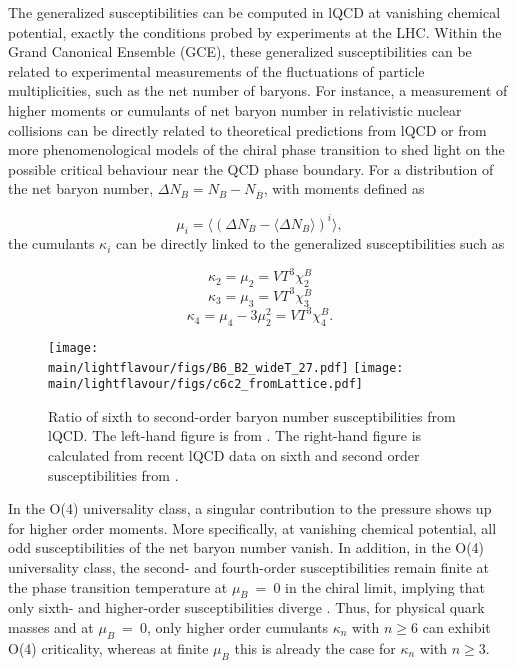 \noindent The generalized susceptibilities can be computed in lQCD at vanishing chemical potential, exactly the conditions probed by experiments at the LHC. Within the Grand Canonical Ensemble (GCE), these generalized susceptibilities can be related to experimental measurements of the fluctuations of particle multiplicities, such as the net number of baryons. For instance, a measurement of higher moments or cumulants of net baryon number in relativistic nuclear collisions can be directly related \cite{Karsch:2010ck,Skokov:2012ds,Karsch:2012wm,Karsch:2017mvg,Borsanyi:2013hza,Borsanyi:2014ewa} to theoretical predictions from lQCD or from more phenomenological models of the chiral phase transition \cite{Almasi:2017bhq,Parotto:2018pwx} to shed light on the possible critical behaviour near the QCD phase boundary. 
For a distribution of the net baryon number, $\Delta N_B = N_B - N_{\overline{B}}$, with moments defined as 

\begin{equation}
\mu_i = \langle (\Delta N_B - \langle \Delta N_B \rangle )^i \rangle ,
\end{equation}
the cumulants $\kappa_i$ can be directly linked to the generalized susceptibilities such as

\begin{equation}
\kappa_2 = \mu_2 = VT^3 \chi_2^B
\end{equation}
\begin{equation}
\kappa_3 = \mu_3 = VT^3 \chi_3^B  
\end{equation}
\begin{equation}
\kappa_4 = \mu_4 - 3\mu_2^2 = VT^3 \chi_4^B.
\end{equation}


\begin{figure}[ht]
\begin{center}
\texttt{[image: \\main/lightflavour/figs/B6\_B2\_wideT\_27.pdf]}
\texttt{[image: \\main/lightflavour/figs/c6c2\_fromLattice.pdf]}
\end{center}
\caption{Ratio of sixth to second-order baryon number susceptibilities from lQCD. The left-hand figure is from \cite{Bazavov:2017dus}. The right-hand figure is calculated from recent lQCD data on  sixth and  second  order susceptibilities from \cite{Borsanyi:2018grb}. }  
\label{fig:chi62}
\end{figure}

In the O(4) universality class, a singular contribution to the pressure shows up for higher order  moments.
More specifically, at vanishing chemical potential, all odd susceptibilities of the net baryon number vanish.  
In addition, in the O(4) universality class, the second- and fourth-order susceptibilities remain finite  at  the  phase  transition  temperature  at $\mu_B~=~0$  in  the  chiral  limit,
implying  that  only  sixth-  and  higher-order  susceptibilities  diverge \cite{Ejiri:2005wq,Friman:2011pf}. Thus, for  physical  quark  masses and at $\mu_B~=~0$, only higher order cumulants $\kappa_n$ with $n\geq 6$ can exhibit O(4) criticality,  whereas at finite $\mu_B$ this is already the case for $\kappa_n$ with $n\geq 3$.  

